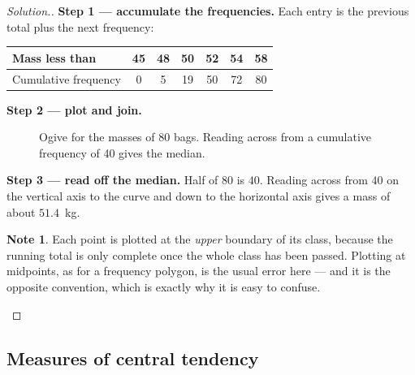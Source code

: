\documentclass[11pt,a4paper]{article}
\theoremstyle{definition}
\newtheorem{note}[thm]{Note}
\newenvironment{solution}
  {\renewcommand{\qedsymbol}{}\begin{proof}[\textit{Solution}.]}
  {\end{proof}}
\begin{document}
\begin{solution}
\textbf{Step 1 --- accumulate the frequencies.} Each entry is the previous total plus
the next frequency:

\begin{table}[H]
\centering
\begin{tabular}{|l|c|c|c|c|c|c|}
\hline
Mass less than & 45 & 48 & 50 & 52 & 54 & 58\\
\hline
Cumulative frequency & 0 & 5 & 19 & 50 & 72 & 80\\
\hline
\end{tabular}
\end{table}

\textbf{Step 2 --- plot and join.}

\begin{figure}[H]
\centering
{}
\caption{Ogive for the masses of 80 bags. Reading across from a cumulative frequency of 40 gives the median.}
\end{figure}

\textbf{Step 3 --- read off the median.} Half of $80$ is $40$. Reading across from $40$
on the vertical axis to the curve and down to the horizontal axis gives a mass of about
$51.4$~kg.

\begin{note}
Each point is plotted at the \emph{upper} boundary of its class, because the running
total is only complete once the whole class has been passed. Plotting at midpoints, as
for a frequency polygon, is the usual error here --- and it is the opposite convention,
which is exactly why it is easy to confuse.
\end{note}
\end{solution}

\subsection{Measures of central tendency}
\end{document}
